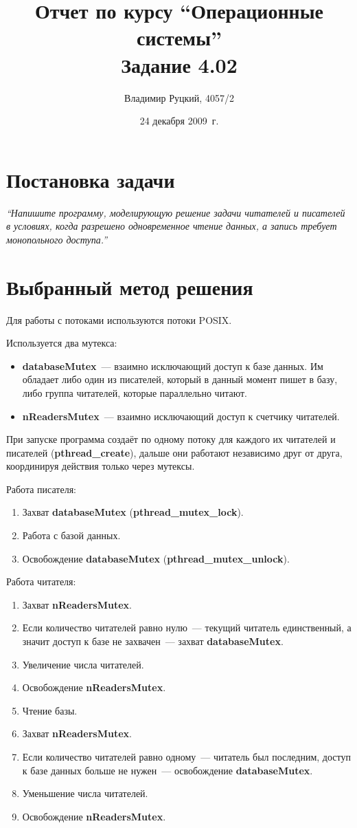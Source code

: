 \documentclass[a4paper,12pt]{article}
\title{Отчет по курсу ``Операционные системы'' \\ Задание 4.02}
\author{Владимир Руцкий, 4057/2}
\date{24 декабря 2009~г.}
\newcommand{\commandquote}[1]{\textbf{#1}}
\newcommand{\varquote}[1]{\textbf{#1}}
\begin{document}
\maketitle

\section*{Постановка задачи}
\textit{``Напишите программу, моделирующую решение задачи читателей и писателей в
условиях, когда разрешено одновременное чтение данных, а запись требует
монопольного доступа.''}

\section*{Выбранный метод решения}
Для работы с потоками используются потоки POSIX.

Используется два мутекса:
\begin{itemize}
 \item \varquote{databaseMutex}~--- взаимно исключающий доступ к базе данных.
Им обладает либо один из писателей, который в данный момент пишет в базу, 
либо группа читателей, которые параллельно читают.
 \item \varquote{nReadersMutex}~--- взаимно исключающий доступ к счетчику читателей.
\end{itemize}

При запуске программа создаёт по одному потоку для каждого их читателей и писателей 
(\commandquote{pthread\_create}),
дальше они работают независимо друг от друга, координируя действия только через мутексы.

Работа писателя:
\begin{enumerate}
 \item Захват \varquote{databaseMutex} (\commandquote{pthread\_mutex\_lock}).
 \item Работа с базой данных.
 \item Освобождение \varquote{databaseMutex} (\commandquote{pthread\_mutex\_unlock}).
\end{enumerate}

Работа читателя:
\begin{enumerate}
 \item Захват \varquote{nReadersMutex}.
 \item Если количество читателей равно нулю~--- текущий читатель единственный, 
а значит доступ к базе не захвачен~--- захват \varquote{databaseMutex}.
 \item Увеличение числа читателей.
 \item Освобождение \varquote{nReadersMutex}.
 \item Чтение базы.
 \item Захват \varquote{nReadersMutex}.
 \item Если количество читателей равно одному~--- читатель был последним, 
доступ к базе данных больше не нужен~--- освобождение \varquote{databaseMutex}.
 \item Уменьшение числа читателей.
 \item Освобождение \varquote{nReadersMutex}.
\end{enumerate}
\end{document}

